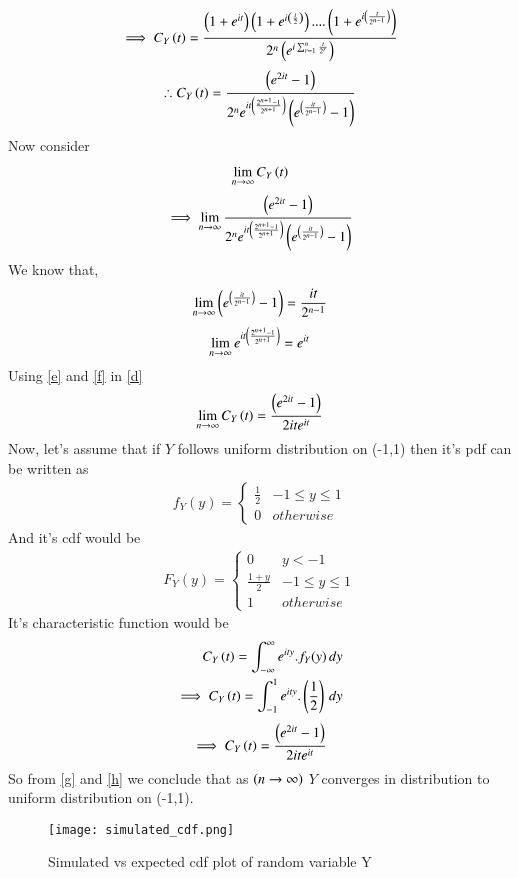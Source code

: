 \documentclass[journal,12pt,twocolumn]{IEEEtran}
\begin{document}
\begin{align}
    \implies C_{Y}\left(t\right)=\frac{\left(1+e^{it}\right)\left(1+e^{i\left(\frac{t}{2}\right)}\right)....\left(1+e^{i\left(\frac{t}{2^{n-1}}\right)}\right)}{2^n\left(e^{i\sum_{r=1}^n\frac{t}{2^r}}\right)}
\end{align}
\begin{align}
     \therefore C_{Y}\left(t\right)=\frac{\left(e^{2it}-1\right)}{2^ne^{it\left(\frac{2^{n+1}-1}{2^{n+1}}\right)}\left(e^{\left(\frac{it}{2^{n-1}}\right)}-1\right)}
     \label{c}
\end{align}
Now consider
\begin{align}
     \lim_{n\to\infty} C_{Y}\left(t\right)
\end{align}
\begin{align}
    \implies \lim_{n\to\infty}\frac{\left(e^{2it}-1\right)}{2^ne^{it\left(\frac{2^{n+1}-1}{2^{n+1}}\right)}\left(e^{\left(\frac{it}{2^{n-1}}\right)}-1\right)}
    \label{d}
\end{align}
We know that,
\begin{align}
    \lim_{n\to\infty}\left(e^{\left(\frac{it}{2^{n-1}}\right)}-1\right) = \frac{it}{2^{n-1}}
    \label{e}
\end{align}
\begin{align}
    \lim_{n\to\infty}e^{it\left(\frac{2^{n+1}-1}{2^{n+1}}\right)}=e^{it}
    \label{f}
\end{align}
Using \eqref{e} and \eqref{f} in \eqref{d}
\begin{align}
    \lim_{n\to\infty} C_{Y}\left(t\right)=\frac{\left(e^{2it}-1\right)}{2ite^{it}}
    \label{g}
\end{align}
Now, let's assume that if $Y$ follows uniform distribution on (-1,1) then it's pdf can be written as
\begin{align}
    f_{Y}(y)=\begin{cases} 
            \frac{1}{2}  &  -1\le y\le 1\\
            0 &  otherwise
            \end{cases}
\end{align}
And it's cdf would be
\begin{align}
    F_{Y}(y)=\begin{cases} 
            0 & y<-1\\
            \frac{1+y}{2}  &  -1\le y\le 1\\
            1 &  otherwise
            \end{cases}
\end{align}
It's characteristic function would be 
\begin{align}
   C_{Y}\left(t\right)= \int_{-\infty}^{\infty} e^{ity}.f_{Y}(y) \,dy\\
    \implies C_{Y}\left(t\right)=\int_{-1}^{1} e^{ity}.\left(\frac{1}{2}\right) \,dy
\end{align}
\begin{align}
    \implies C_{Y}\left(t\right)=\frac{\left(e^{2it}-1\right)}{2ite^{it}}
    \label{h}
\end{align}
So from \eqref{g} and \eqref{h} we conclude that as $\left(n\rightarrow\infty\right)$ $Y$ converges in distribution to uniform distribution on (-1,1).
\begin{figure}[h]
    \centering
    \texttt{[image: simulated\_cdf.png]}
    \caption{Simulated vs expected cdf plot of random variable Y}
    \label{cdf_plot}
\end{figure}
\end{document}
